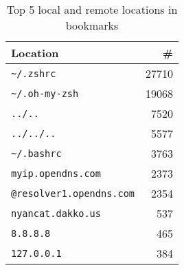 \begin{table}
    \caption{Top 5 local and remote locations in bookmarks}
    \label{tab:bookmarks}
    \begin{tabular}{lr}
        \toprule
        Location & \# \\        
        \midrule
        \verb|~/.zshrc| & \num{27710} \\
        \verb|~/.oh-my-zsh| & \num{19068} \\
        \verb|../..| & \num{7520} \\
        \verb|../../..| & \num{5577} \\
        \verb|~/.bashrc| & \num{3763} \\
        \midrule
        \verb|myip.opendns.com| & \num{2373} \\
        \verb|@resolver1.opendns.com| & \num{2354} \\
        \verb|nyancat.dakko.us| & \num{537} \\        
        \verb|8.8.8.8| & \num{465} \\
        \verb|127.0.0.1| & \num{384} \\
        \bottomrule
    \end{tabular}
\end{table}